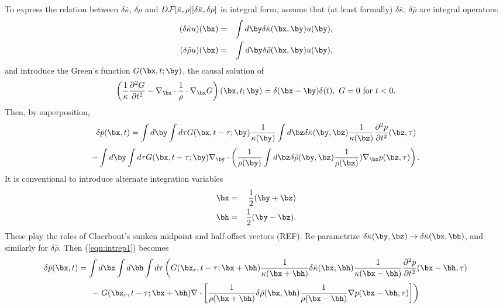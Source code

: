 To express the relation between $\delta \bar{\kappa}$, $\delta \rho$
and $D\bar{{\cal F}}[\bar{\kappa},\rho][\delta \bar{\kappa},\delta
\rho]$ in integral form, assume that (at least formally) $\delta
\bar{\kappa}$, $\delta \bar{\rho}$ are integral operators:
\begin{eqnarray}
\label{eqn:dkappa}
(\delta \bar{\kappa} u)(\bx) &=& \int d\by \delta 
  \bar{\kappa}(\bx,\by)u(\by),\\
(\delta \bar{\rho} u)(\bx) &=& \int d\by \delta 
  \bar{\rho}(\bx,\by)u(\by),\\
\end{eqnarray}
and introduce the Green's function $G(\bx,t;\by)$, the causal solution
of
\begin{equation}
\label{eqn:green}
\left(\frac{1}{\kappa}\frac{\partial^2 G}{\partial t^2} - \nabla_{\bx} \cdot
  \frac{1}{\rho} \cdot \nabla_{\bx}G\right)(\bx,t;\by) =
\delta(\bx-\by)\delta(t), \,\, G=0 \mbox{ for } t < 0.
\end{equation}
Then, by superposition,
\[
\delta \bar{p}(\bx,t)  = \int d\by \int d\tau G(\bx,t-\tau;\by)
\frac{1}{\kappa(\by)}  \int d\bz \delta \bar{\kappa}(\by,\bz) \frac{1}{\kappa(\bz)}
 \frac{\partial^2 p}{\partial t^2}(\bz,\tau) 
\]
\begin{equation}
\label{eqn:intrep1}
- \int d\by \int d\tau G(\bx,t-\tau;\by)\nabla_{\by} \cdot \left(
\frac{1}{\rho(\by)}\int d\bz \delta \bar{\rho}(\by,\bz)\frac{1}{\rho(\bz)}) \nabla_{\bz} p(\bz,\tau)\right). 
\end{equation}
It is conventional to introduce alternate integration variables
\begin{eqnarray}
\label{eqn:jon}
\bx &=& \frac{1}{2}(\by + \bz) \nonumber\\
\bh &=& \frac{1}{2}(\by - \bz).
\end{eqnarray}
These play the roles of Claerbout's sunken midpoint and half-offset
vectors (REF). Re-parametrize $\delta\bar{\kappa}(\by,\bz) \rightarrow
\delta\bar{\kappa}(\bx,\bh)$, and similarly for $\delta \bar{\rho}$. Then (\ref{eqn:intrep1}) becomes
\[
\delta \bar{p}(\bx,t)  = \int d\bx\int d\bh \int d\tau
\left( G(\bx_r,t-\tau;\bx+\bh) 
\frac{1}{\kappa(\bx+\bh)}  \delta \bar{\kappa}(\bx,\bh) \frac{1}{\kappa(\bx-\bh)}
 \frac{\partial^2 p}{\partial t^2}(\bx-\bh,\tau)
\right.
\]
\begin{equation}
\label{eqn:intrep2}
-\left.  G(\bx_r,t-\tau;\bx+\bh) \nabla \cdot \left[
\frac{1}{\rho(\bx+\bh)}  \delta \bar{\rho}(\bx,\bh) \frac{1}{\rho(\bx-\bh)}\nabla
 p(\bx-\bh,\tau)\right]\right)
\end{equation}

